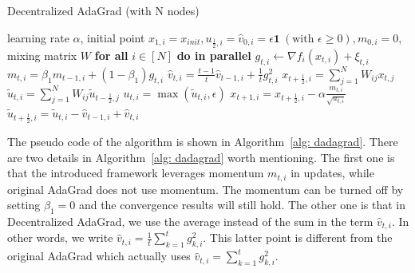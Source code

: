 \documentclass[11pt]{article}
\begin{document}
\newpage



\begin{algorithm}[t]
	\caption{Decentralized AdaGrad (with N nodes)}
	\label{alg: dadagrad}
	\begin{algorithmic}[1]
		 learning rate $\alpha$, initial point $x_{1,i} = x_{init}, u_{\frac{1}{2},i} = \hat v_{0,i} = \epsilon \mathbf 1\ (\text{with } \epsilon \geq 0), m_{0,i}=0$, mixing matrix $W$ 
		\STATE \textbf{for all }$i \in [N]$ \textbf{do in parallel}
 		\STATE \quad $g_{t,i}  \leftarrow \nabla f_i(x_{t,i}) + \xi_{t,i}$
 		\STATE \quad $m_{t,i} = \beta_1 m_{t-1,i} + (1-\beta_1) g_{t,i}$ 
 		\STATE \quad $ \hat v_{t,i} = \frac{t-1}{t} \hat v_{t-1,i} + \frac{1}{t} g_{t,i}^2 $
 		\STATE \quad $x_{t+\frac{1}{2},i} = \sum_{j=1}^N W_{ij}x_{t,j}$
 		\STATE \quad $\tilde u_{t,i} = \sum_{j=1}^N W_{ij}\tilde u_{t-\frac{1}{2},j}$
 	    \STATE \quad $u_{t,i} = \max(\tilde u_{t,i}, \epsilon)$
 		\STATE \quad $x_{t+1,i} = x_{t+\frac{1}{2},i} - \alpha \frac{m_{t,i}}{\sqrt{u_{t,i}}}$
 		\STATE \quad $\tilde u_{t+\frac{1}{2},i} = \tilde u_{t,i} - \hat v_{t-1,i} + \hat v_{t,i}$
 		\ENDFOR
 	\end{algorithmic}
 \end{algorithm}
 

The pseudo code of the algorithm is shown in Algorithm~\ref{alg: dadagrad}. 
There are two details in Algorithm~\ref{alg: dadagrad} worth mentioning.  The first one is that the introduced framework leverages momentum $m_{t,i}$ in updates, while original AdaGrad does not use momentum. 
The momentum can be turned off by setting $\beta_1 = 0$ and the convergence results will still hold. 
The other one is that in Decentralized AdaGrad, we use the average instead of the sum in the term $\hat v_{t,i}$. 
In other words, we write $\hat v_{t,i} = {\frac{1}{t}\sum_{k=1}^t g_{k,i}^2}$. 
This latter point is different from the original AdaGrad which actually uses $\hat v_{t,i} = {\sum_{k=1}^t g_{k,i}^2}$. 
\end{document}

